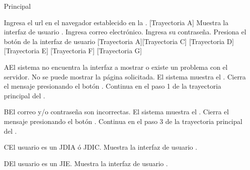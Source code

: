 \begin{UCtrayectoria}{Principal}
    
    \UCpaso[\UCactor] Ingresa el url en el navegador establecido en la . [Trayectoria A] 
    \UCpaso Muestra la interfaz de usuario .
    \UCpaso[\UCactor] Ingresa correo electrónico.
    \UCpaso[\UCactor] Ingresa su contraseña.
    \UCpaso[\UCactor] Presiona el botón  de la interfaz de usuario   [Trayectoria A][Trayectoria C] [Trayectoria D] [Trayectoria E] [Trayectoria F] [Trayectoria G]
\end{UCtrayectoria}


\begin{UCtrayectoriaA}{A}{El sistema no encuentra la interfaz a mostrar o existe un problema con el servidor.}
    \UCpaso No se puede mostrar la página solicitada.
    \UCpaso El sistema muestra el   .
    \UCpaso[\UCactor] Cierra el mensaje presionando el botón .
    \UCpaso Continua en el paso 1 de la trayectoria principal del .
\end{UCtrayectoriaA}


\begin{UCtrayectoriaA}{B}{El correo y/o contraseña son incorrectas.}
    \UCpaso El sistema muestra el  .
    \UCpaso[\UCactor] Cierra el mensaje presionando el botón .
    \UCpaso Continua en el paso 3 de la trayectoria principal del .
\end{UCtrayectoriaA}



\begin{UCtrayectoriaA}{C}{El usuario es un JDIA ó JDIC.}
    \UCpaso Muestra la interfaz de usuario .
\end{UCtrayectoriaA}


\begin{UCtrayectoriaA}{D}{El usuario es un JIE.}
    \UCpaso Muestra la interfaz de usuario .
\end{UCtrayectoriaA}

